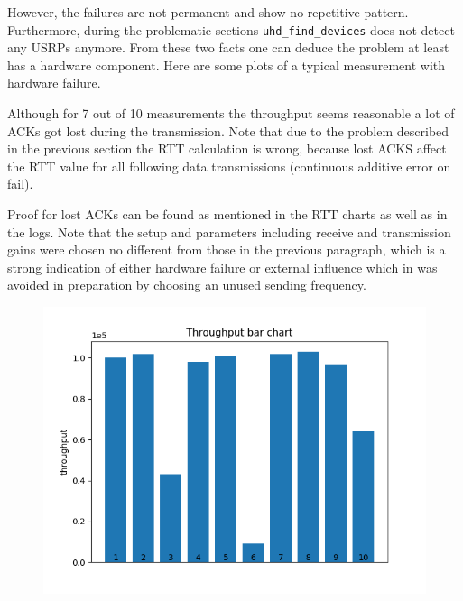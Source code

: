 \documentclass{article}
\begin{document}
However, the failures are not permanent and show no repetitive pattern. Furthermore, during the problematic sections \texttt{uhd\_find\_devices} does not detect any USRPs anymore. From these two facts one can deduce the problem at least has a hardware component. Here are some plots of a typical measurement with hardware failure. 

\bigskip

Although for 7 out of 10 measurements the throughput seems reasonable a lot of ACKs got lost during the transmission. Note that due to the problem described in the previous section the RTT calculation is wrong, because lost ACKS affect the RTT value for all following data transmissions (continuous additive error on fail). 

\bigskip

Proof for lost ACKs can be found as mentioned in the RTT charts as well as in the logs. Note that the setup and parameters including receive and transmission gains were chosen no different from those in the previous paragraph, which is a strong indication of either hardware failure or external influence which in was avoided in preparation by choosing an unused sending frequency. 

\begin{figure}[h] \label{usrp-fails2-1}
	\includegraphics[width=\textwidth]{usrp_fail2_tp_bar}
	
\end{figure}
\end{document}
